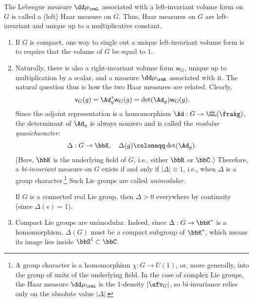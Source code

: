 \begin{defn}
    The Lebesgue measure $\dd\mu_\rmL$ associated with a left-invariant volume form on $G$ is called a (left) Haar measure on $G$. Thus, Haar measures on $G$ are left-invariant and unique up to a multiplicative constant.
\end{defn}

\begin{rem}\label{rem biinvariant measures}
    \begin{enumerate}
        \item If $G$ is compact, one way to single out a unique left-invariant volume form is to require that the volume of $G$ be equal to $1$.
        \item Naturally, there is also a right-invariant volume form $\mathsf{w}_G$, unique up to multiplication by a scalar, and a measure $\dd\mu_\rmR$ associated with it. The natural question thus is how the two Haar measures are related. Clearly,
        \[\mathsf{v}_G(g)=\Ad_g^\ast \mathsf{w}_G(g)=\det(\Ad_g)\mathsf{w}_G(g).\]
        Since the adjoint representation is a homomorphism $\Ad:G\to\GL(\frakg)$, the determinant of $\Ad_g$ is always nonzero and is called the \emph{modular quasicharacter}:
        \[\Delta: G\to \bbK,\quad \Delta(g)\coloneqq\det(\Ad_g).\]
        (Here, $\bbK$ is the underlying field of $G$, i.e., either $\bbR$ or $\bbC$.)
        Therefore, a \emph{bi-invariant} measure on $G$ exists if and only if $|\Delta|\equiv 1$, i.e., when $\Delta$ is a group character.\footnote{A group character is a homomorphism $\chi:G\to U(1)$, or, more generally, into the group of units of the underlying field. In the case of complex Lie groups, the Haar measure $\dd \mu_\rmL$ is the $1$-density $|\sfv_G|$, so bi-invariance relies only on the absolute value $|\Delta|$.} Such Lie groups are called \emph{unimodular}.
        
        If $G$ is a connected real Lie group, then $\Delta>0$ everywhere by continuity (since $\Delta(e)=1$). 
        \item Compact Lie groups are unimodular. Indeed, since $\Delta:G\to \bbK^\ast$ is a homomorphism, $\Delta(G)$ must be a compact subgroup of $\bbK^\ast$, which means its image lies inside $\bbS^1\subset\bbC$.
    \end{enumerate}
\end{rem}



